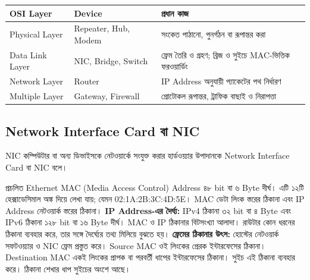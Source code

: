 \begin{center}
\begin{tabular}{|p{}|p{}|p{}|}
\hline
\textbf{OSI Layer} & \textbf{Device} & \textbf{প্রধান কাজ} \\
\hline
Physical Layer & Repeater, Hub, Modem & সংকেত পাঠানো, পুনর্গঠন বা রূপান্তর করা \\
\hline
Data Link Layer & NIC, Bridge, Switch & ফ্রেম তৈরি ও গ্রহণ; ব্রিজ ও সুইচে MAC-ভিত্তিক ফরওয়ার্ডিং \\
\hline
Network Layer & Router & IP Address অনুযায়ী প্যাকেটের পথ নির্ধারণ \\
\hline
Multiple Layer & Gateway, Firewall & প্রোটোকল রূপান্তর, ট্রাফিক বাছাই ও নিরাপত্তা \\
\hline
\end{tabular}
\end{center}





\subsection{Network Interface Card বা NIC}

\begin{definitionbox}{NIC}
কম্পিউটার বা অন্য ডিভাইসকে নেটওয়ার্কে সংযুক্ত করার হার্ডওয়্যার উপাদানকে Network Interface Card বা NIC বলে।
\end{definitionbox}

প্রচলিত Ethernet MAC (Media Access Control) Address ৪৮ bit বা ৬ Byte দীর্ঘ। এটি ১২টি হেক্সাডেসিমাল অঙ্ক দিয়ে লেখা যায়; যেমন 02:1A:2B:3C:4D:5E। MAC ডেটা লিংক স্তরের ঠিকানা এবং IP Address নেটওয়ার্ক স্তরের ঠিকানা।
\textbf{IP Address-এর দৈর্ঘ্য:} IPv4 ঠিকানা ৩২ bit বা ৪ Byte এবং IPv6 ঠিকানা ১২৮ bit বা ১৬ Byte দীর্ঘ। MAC ও IP ঠিকানার বিটসংখ্যা আলাদা। রাউটার কোন ধরনের ঠিকানা ব্যবহার করে, তার সঙ্গে দৈর্ঘ্যের তথ্য মিলিয়ে বুঝতে হয়।
\textbf{ফ্রেমের ঠিকানার উৎস:} হোস্টের নেটওয়ার্ক সফটওয়্যার ও NIC ফ্রেম প্রস্তুত করে। Source MAC ওই লিংকের প্রেরক ইন্টারফেসের ঠিকানা। Destination MAC একই লিংকের প্রাপক বা পরবর্তী ধাপের ইন্টারফেসের ঠিকানা। সুইচ এই ঠিকানা ব্যবহার করে। ঠিকানা শেখার ধাপ সুইচের অংশে আছে।


